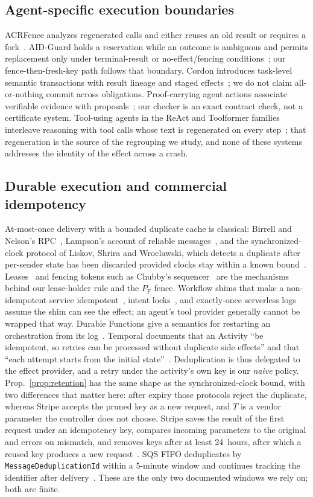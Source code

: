 \documentclass[conference,10pt]{IEEEtran}
\newcommand{\PF}{P_{\mathrm{F}}}
\begin{document}
\subsection{Agent-specific execution boundaries}
ACRFence analyzes regenerated calls and either reuses an old result or requires a fork~\cite{acrfence}. AID-Guard holds a reservation while an outcome is ambiguous and permits replacement only under terminal-result or no-effect/fencing conditions~\cite{aidguard}; our fence-then-fresh-key path follows that boundary. Cordon introduces task-level semantic transactions with result lineage and staged effects~\cite{cordon}; we do not claim all-or-nothing commit across obligations. Proof-carrying agent actions associate verifiable evidence with proposals~\cite{pca}; our checker is an exact contract check, not a certificate system. Tool-using agents in the ReAct and Toolformer families interleave reasoning with tool calls whose text is regenerated on every step~\cite{react,toolformer}; that regeneration is the source of the regrouping we study, and none of these systems addresses the identity of the effect across a crash.

\subsection{Durable execution and commercial idempotency}
At-most-once delivery with a bounded duplicate cache is classical: Birrell and Nelson's RPC~\cite{birrell}, Lampson's account of reliable messages~\cite{lampson}, and the synchronized-clock protocol of Liskov, Shrira and Wroclawski, which detects a duplicate after per-sender state has been discarded provided clocks stay within a known bound~\cite{liskov1991}. Leases~\cite{gray1989} and fencing tokens such as Chubby's sequencer~\cite{chubby} are the mechanisms behind our lease-holder rule and the $\PF$ fence. Workflow shims that make a non-idempotent service idempotent~\cite{ramalingam}, intent locks~\cite{olive}, and exactly-once serverless logs~\cite{beldi,boki} assume the shim can see the effect; an agent's tool provider generally cannot be wrapped that way. Durable Functions give a semantics for restarting an orchestration from its log~\cite{durablefunctions}. Temporal documents that an Activity ``be idempotent, so retries can be processed without duplicate side effects'' and that ``each attempt starts from the initial state''~\cite{temporal}. Deduplication is thus delegated to the effect provider, and a retry under the activity's own key is our \emph{naive} policy. Prop.~\ref{prop:retention} has the same shape as the synchronized-clock bound, with two differences that matter here: after expiry those protocols reject the duplicate, whereas Stripe accepts the pruned key as a new request, and $T$ is a vendor parameter the controller does not choose. Stripe saves the result of the first request under an idempotency key, compares incoming parameters to the original and errors on mismatch, and removes keys after at least 24~hours, after which a reused key produces a new request~\cite{stripe}. SQS FIFO deduplicates by \texttt{MessageDeduplicationId} within a 5-minute window and continues tracking the identifier after delivery~\cite{sqsdedup}. These are the only two documented windows we rely on; both are finite.
\end{document}

